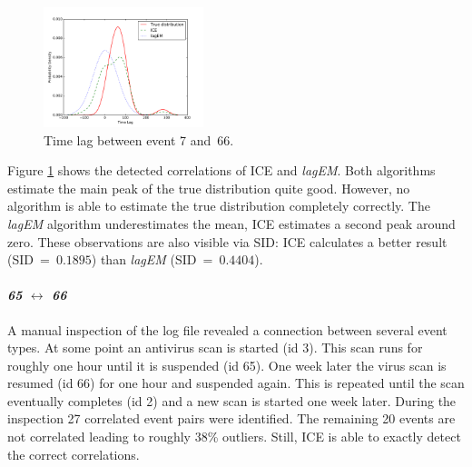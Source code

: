 \documentclass[conference]{IEEEtran}
\theoremstyle{examplestyle}
\newcommand\imgsize{0.415}
\begin{document}
\begin{figure}[!tb]
	\centering
	\includegraphics[width=\imgsize\textwidth]{images/symantec/7-66.pdf}
	\caption{Time lag between event 7 and~66.}
	\label{fig:7-66}
\end{figure}

Figure \ref{fig:7-66} shows the detected correlations of \ac{ICE} and \textit{lagEM}. Both algorithms estimate the main peak of the true distribution quite good. However, no algorithm is able to estimate the true distribution completely correctly. The \textit{lagEM} algorithm underestimates the mean, \ac{ICE} estimates a second peak around zero. These observations are also visible via \ac{SID}: \ac{ICE} calculates a better result (\ac{SID}~=~$0.1895$) than \textit{lagEM} (\ac{SID}~=~$0.4404$).




\paragraph{\textit{65} \(\leftrightarrow\) \textit{66}} A manual inspection of the log file revealed a connection between several event types. At some point an antivirus scan is started (id 3). This scan runs for roughly one hour until it is suspended (id 65). One week later the virus scan is resumed (id 66) for one hour and suspended again. This is repeated until the scan eventually completes (id 2) and a new scan is started one week later. During the inspection 27 correlated event pairs were identified. The remaining 20 events are not correlated leading to roughly 38\% outliers. Still, \ac{ICE} is able to exactly detect the correct correlations.
\end{document}
